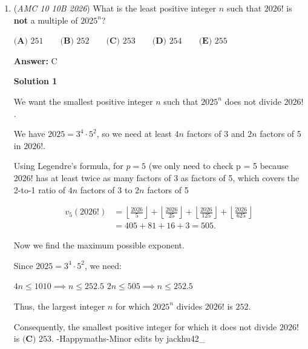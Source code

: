 \begin{enumerate}
 



\textbf{Solution 5}

First, we make a table. We have a column for the assumed number of false statements. We realize that if we have (for example) 1001 false statements, the first statement must be true, and all other 2025 statements must be false. If we have 1002 false statements, the first two statements must be true, and all other 2024 statements must be false. We organize the data into a table, as shown below.

 


	\item (\textit{AMC 10 10B 2026}) What is the least positive integer $n$ such that $2026!$ is \textbf{not} a multiple of $2025^n$?


 $\textbf{(A) }251 \qquad \textbf{(B) }252 \qquad \textbf{(C) }253 \qquad \textbf{(D) }254 \qquad \textbf{(E) }255$

 \textbf{Answer: }C



\textbf{Solution 1}

We want the smallest positive integer $n$ such that $2025^n$ does not divide $2026!$.

 We have $2025 = 3^4 \cdot 5^2$, so we need at least $4n$ factors of 3 and $2n$ factors of 5 in $2026!$. 

 Using Legendre's formula, for $p = 5$ (we only need to check p = 5 because 2026! has at least twice as many factors of 3 as factors of 5, which covers the 2-to-1 ratio of $4n$ factors of 3 to $2n$ factors of 5

 \begin{align*}v_5(2026!) &= \left\lfloor\frac{2026}{5}\right\rfloor + \left\lfloor\frac{2026}{25}\right\rfloor + \left\lfloor\frac{2026}{125}\right\rfloor + \left\lfloor\frac{2026}{625}\right\rfloor \\[1em]& = 405+81+16+3 = 505.\end{align*}


 Now we find the maximum possible exponent.

 Since $2025=3^4\cdot5^2$, we need:

 $4n\leq1010\implies n\leq252.5$
$2n\leq505\implies n\leq252.5$

 Thus, the largest integer $n$ for which $2025^n$ divides $2026!$ is $252$.

 Consequently, the smallest positive integer for which it does not divide $2026!$ is $\boxed{\textbf{(C) }253}$. -Happymaths-Minor edits by jackhu42\_


\end{enumerate}
